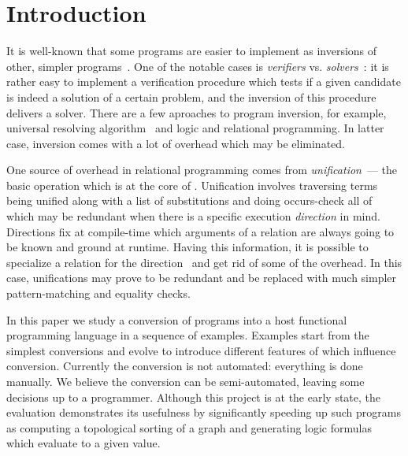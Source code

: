 \section{Introduction}

It is well-known that some programs are easier to implement as inversions of other, simpler programs~\cite{Abramov2002}. One of the notable
cases is \emph{verifiers} vs. \emph{solvers}~\cite{lozov2019relational}: it is rather easy to implement a verification procedure which tests
if a given candidate is indeed a solution of a certain problem, and the inversion of this procedure delivers a solver. 
There are a few aproaches to program inversion, for example, universal resolving algorithm~\cite{abramov2002principles} and logic and
relational programming. In latter case, inversion comes with a lot of overhead which may be eliminated.

One source of overhead in relational programming comes from \emph{unification}~--- the basic operation which is at the core of \mk.
Unification involves traversing terms being unified along with a list of substitutions and doing occurs-check all of which may be redundant when there is a specific execution \emph{direction} in mind.
Directions fix at compile-time which arguments of a relation are always going to be known and ground at runtime.
Having this information, it is possible to specialize a relation for the direction~\cite{EPTCS341.5} and get rid of some of the overhead.
In this case, unifications may prove to be redundant and be replaced with much simpler pattern-matching and equality checks.

In this paper we study a conversion of \mk programs into a host functional programming language in a sequence of examples.
Examples start from the simplest conversions and evolve to introduce different features of \mk which influence conversion.
Currently the conversion is not automated: everything is done manually. We believe the conversion can be semi-automated, leaving
some decisions up to a programmer. Although this project is at the early state, the evaluation demonstrates its usefulness by
significantly speeding up such programs as computing a topological sorting of a graph and generating logic formulas which evaluate
to a given value.

